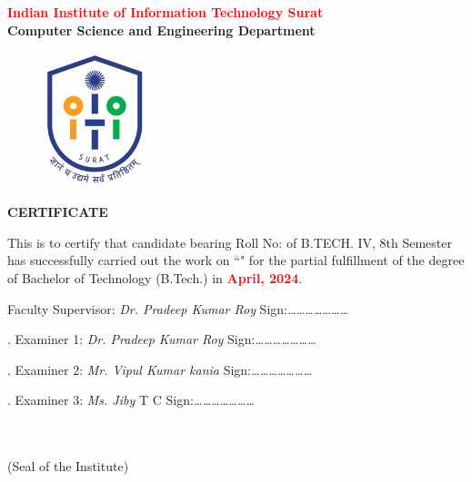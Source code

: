 \thispagestyle{plain}

\begin{center}
{\Large {\textbf {\textcolor{red}{Indian Institute of Information Technology Surat}\\Computer Science and Engineering Department}}}
\end{center}

\vspace{1.25cm}
\justify


\begin{figure}[h]
    \centering
    \includegraphics[width=30mm]{Formalities/IIIT_Surat_logo}\label{fig:figure}
\end{figure}

\begin{center}
{\Large {\bf \uppercase{Certificate}}}
\end{center}
\vspace{1.5cm}
\normalsize
\noindent This is to certify that candidate \textcolor{red}{\textbf{\myname}} bearing Roll No: \textcolor{red}{\textbf{\myrollno}} of B.TECH. IV, 8th Semester has successfully carried out the work on  ``\textcolor{red}{\textbf{\myprojectname}}" for the partial fulfillment of the degree of Bachelor of Technology (B.Tech.) in \textcolor{red}{\textbf{April, 2024}}.

\vspace{3\baselineskip}

\noindent Faculty Supervisor: \emph{Dr. Pradeep Kumar Roy}   \hfill Sign:\emph{…………………}\\
\vspace{1cm}

.  Examiner 1: \emph{ Dr. Pradeep Kumar Roy} \hfill Sign:\emph{…………………}\\
\vspace{0.3cm}

.  Examiner 2: \emph{ Mr. Vipul Kumar kania} \hfill Sign:\emph{…………………}\\
\vspace{0.3cm}

.  Examiner 3: \emph{ Ms. Jiby} T C \hfill Sign:\emph{…………………}\\
\vspace{0.3cm}

\begin{flushright} 

{\small \bf \textcolor{white}{}}\\
{\small \bf \textcolor{white}{}}\\
{\small (Seal of the Institute)} \\
\end{flushright}



